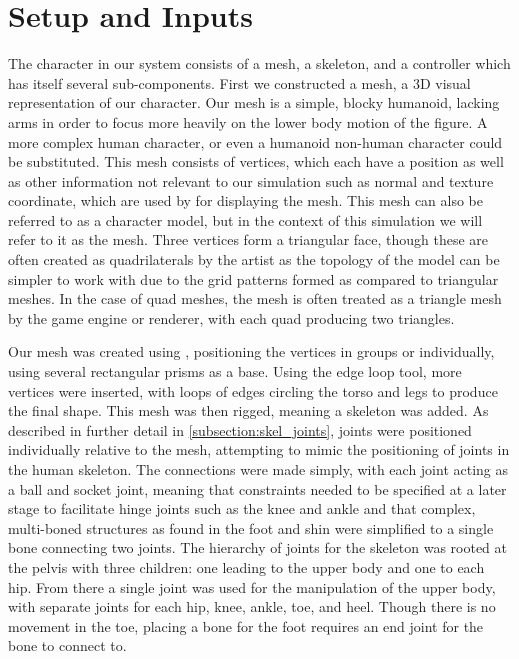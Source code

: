 \section{Setup and Inputs}
The character in our system consists of a mesh, a skeleton, and a controller which has itself several sub-components.  First we constructed a mesh, a 3D visual representation of our character.  Our mesh is a simple, blocky humanoid, lacking arms in order to focus more heavily on the lower body motion of the figure.  A more complex human character, or even a humanoid non-human character could be substituted.  This mesh consists of vertices, which each have a position as well as other information not relevant to our simulation such as normal and texture coordinate, which are used by \unity for displaying the mesh.  This mesh can also be referred to as a character model, but in the context of this simulation we will refer to it as the mesh.  Three vertices form a triangular face, though these are often created as quadrilaterals by the artist as the topology of the model can be simpler to work with due to the grid patterns formed as compared to triangular meshes.  In the case of quad meshes, the mesh is often treated as a triangle mesh by the game engine or renderer, with each quad producing two triangles.

Our mesh was created using \maya, positioning the vertices in groups or individually, using several rectangular prisms as a base.  Using the edge loop tool, more vertices were inserted, with loops of edges circling the torso and legs to produce the final shape.  This mesh was then rigged, meaning a skeleton was added.  As described in further detail in \ref{subsection:skel_joints}, joints were positioned individually relative to the mesh, attempting to mimic the positioning of joints in the human skeleton.  The connections were made simply, with each joint acting as a ball and socket joint, meaning that constraints needed to be specified at a later stage to facilitate hinge joints such as the knee and ankle and that complex, multi-boned structures as found in the foot and shin were simplified to a single bone connecting two joints.  The hierarchy of joints for the skeleton was rooted at the pelvis with three children: one leading to the upper body and one to each hip.  From there a single joint was used for the manipulation of the upper body, with separate joints for each hip, knee, ankle, toe, and heel.  Though there is no movement in the toe, placing a bone for the foot requires an end joint for the bone to connect to.

